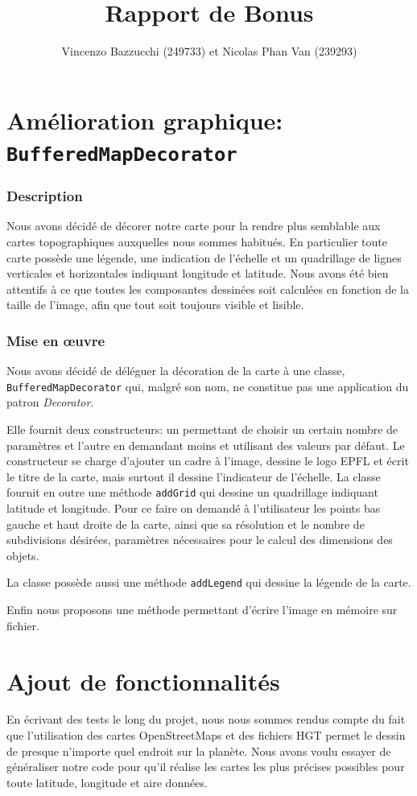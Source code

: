 \documentclass[11pt,a4paper]{article}
\author{Vincenzo Bazzucchi (249733) et Nicolas Phan Van (239293)}
\title{Rapport de Bonus}
\date{}
\begin{document}
\maketitle

\section{Amélioration graphique: \texttt{BufferedMapDecorator}}
\subsubsection*{Description}
Nous avons décidé de décorer notre carte pour la rendre plus semblable aux cartes topographiques auxquelles nous sommes habitués.
En particulier toute carte possède une légende, une indication de l'échelle et un quadrillage de lignes verticales et horizontales indiquant longitude et latitude. Nous avons été bien attentifs à ce que toutes les composantes dessinées soit calculées en fonction de la taille de l'image, afin que tout soit toujours visible et lisible.
\subsubsection{Mise en œuvre}
Nous avons décidé de déléguer la décoration de la carte à une classe, \texttt{BufferedMapDecorator} qui, malgré son nom, ne constitue pas une application du patron \textit{Decorator}.

Elle fournit deux constructeurs: un permettant de choisir un certain nombre de paramètres et l'autre en demandant moins et utilisant des valeurs par défaut.
Le constructeur se charge d'ajouter un cadre à l'image, dessine le logo EPFL et écrit le titre de la carte, mais surtout il dessine l'indicateur de l'échelle.
La classe fournit en outre une méthode \texttt{addGrid} qui dessine un quadrillage indiquant latitude et longitude. Pour ce faire on demandé à l'utilisateur les points bas gauche et haut droite de la carte, ainsi que sa résolution et le nombre de subdivisions désirées, paramètres nécessaires pour le calcul des dimensions des objets.

La classe possède aussi une méthode \texttt{addLegend} qui dessine la légende de la carte.

Enfin nous proposons une méthode permettant d'écrire l'image en mémoire sur fichier.

\section{Ajout de fonctionnalités}
En écrivant des tests le long du projet, nous nous sommes rendus compte du fait que l'utilisation des cartes OpenStreetMaps et des fichiers HGT permet le dessin de presque n'importe quel endroit sur la planète. Nous avons voulu essayer de généraliser notre code pour qu'il réalise les cartes les plus précises possibles pour toute latitude, longitude et aire données.
\end{document}
